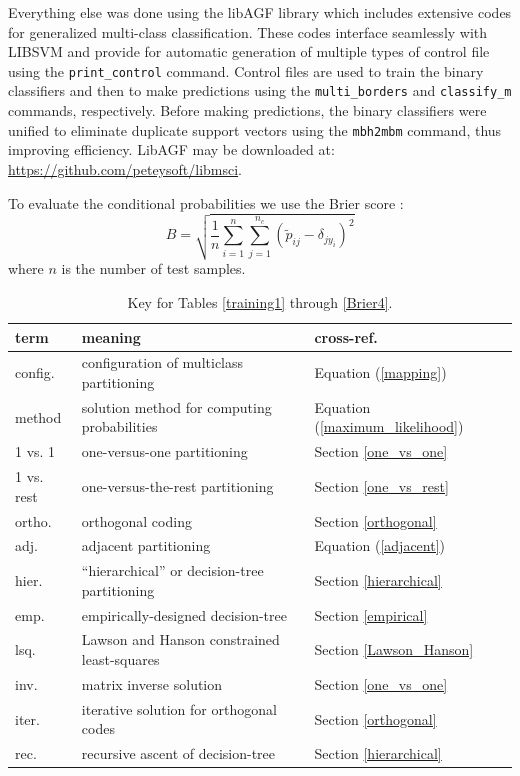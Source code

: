 \documentclass{article}
\newenvironment{eqnnon}{\begin{equation*}}{\end{equation*}}
\begin{document}
Everything else was done using the libAGF library \citep{Mills2011,Mills2018}
which includes extensive codes for generalized multi-class classification.
These codes interface seamlessly with LIBSVM and provide for automatic
generation of multiple types of control file using the \verb/print_control/
command.
Control files are used to train the binary classifiers and then
to make predictions using the \verb/multi_borders/ and \verb/classify_m/
commands, respectively.
Before making predictions, the binary classifiers were unified to eliminate
duplicate support vectors using the \verb/mbh2mbm/ command, thus improving
efficiency.
LibAGF may be downloaded at: \url{https://github.com/peteysoft/libmsci}.

To evaluate the conditional probabilities we use the Brier score
\citep{Brier1950, Jolliffe_Stephenson2003}:
\begin{eqnnon}
B=\sqrt{\frac{1}{n} \sum_{i=1}^{n} \sum_{j=1}^{n_c} \left ( \tilde p_{ij} - \delta_{jy_i} \right )^2}
\end{eqnnon}
where $n$ is the number of test samples.

\begin{table}
	\caption{Key for Tables \ref{training1} through \ref{Brier4}.}\label{key}
	\begin{tabular}{|lll|}
		\hline
		term & meaning & cross-ref. \\
		\hline\hline
		config. & configuration of multiclass partitioning & Equation (\ref{mapping}) \\
		method & solution method for computing probabilities & Equation (\ref{maximum_likelihood}) \\
		\hline
		1 vs. 1 & one-versus-one partitioning & Section \ref{one_vs_one} \\
		1 vs. rest & one-versus-the-rest partitioning & Section \ref{one_vs_rest} \\
		ortho. & orthogonal coding & Section \ref{orthogonal} \\
		adj. & adjacent partitioning & Equation (\ref{adjacent}) \\
		hier. & ``hierarchical'' or decision-tree partitioning & Section \ref{hierarchical} \\
		emp. & empirically-designed decision-tree & Section \ref{empirical} \\
		\hline
		lsq. & Lawson and Hanson constrained least-squares & Section \ref{Lawson_Hanson} \\
		inv. & matrix inverse solution & Section \ref{one_vs_one} \\
		iter. & iterative solution for orthogonal codes & Section \ref{orthogonal} \\
		rec. & recursive ascent of decision-tree & Section \ref{hierarchical} \\
		\hline
	\end{tabular}
\end{table}
\end{document}
